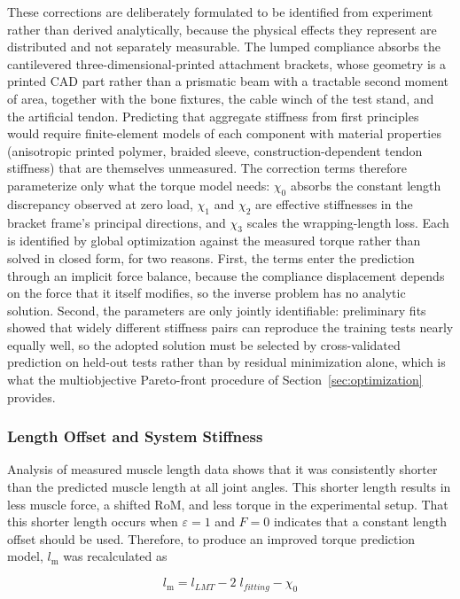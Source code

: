 These corrections are deliberately formulated to be identified from experiment rather than derived analytically, because the physical effects they represent are distributed and not separately measurable. The lumped compliance absorbs the cantilevered three-dimensional-printed attachment brackets, whose geometry is a printed CAD part rather than a prismatic beam with a tractable second moment of area, together with the bone fixtures, the cable winch of the test stand, and the artificial tendon. Predicting that aggregate stiffness from first principles would require finite-element models of each component with material properties (anisotropic printed polymer, braided sleeve, construction-dependent tendon stiffness) that are themselves unmeasured. The correction terms therefore parameterize only what the torque model needs: $\chi_{0}$ absorbs the constant length discrepancy observed at zero load, $\chi_{1}$ and $\chi_{2}$ are effective stiffnesses in the bracket frame's principal directions, and $\chi_{3}$ scales the wrapping-length loss. Each is identified by global optimization against the measured torque rather than solved in closed form, for two reasons. First, the terms enter the prediction through an implicit force balance, because the compliance displacement depends on the force that it itself modifies, so the inverse problem has no analytic solution. Second, the parameters are only jointly identifiable: preliminary fits showed that widely different stiffness pairs can reproduce the training tests nearly equally well, so the adopted solution must be selected by cross-validated prediction on held-out tests rather than by residual minimization alone, which is what the multiobjective Pareto-front procedure of Section~\ref{sec:optimization} provides.

\subsubsection{Length Offset and System Stiffness}\label{sec:offset_stiffness}

Analysis of measured muscle length data shows that it was consistently shorter than the predicted muscle length at all joint angles. This shorter length results in less muscle force, a shifted RoM, and less torque in the experimental setup. That this shorter length occurs when $\varepsilon=1$ and $F=0$ indicates that a constant length offset should be used. Therefore, to produce an improved torque prediction model, $l_\text{m}$ was recalculated as

\begin{equation}
    l_\text{m} = l_{LMT} - 2\;l_{fitting} - \chi_{0} 
    \label{eq:Lm}
\end{equation}

